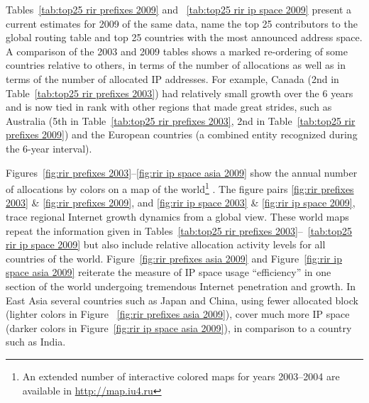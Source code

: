 Tables~\ref{tab:top25 rir prefixes 2009} and ~\ref{tab:top25 rir ip space
2009} present a current estimates for 2009 of the same data, name the 
top 25 contributors to the global routing table and top 25 countries with 
the most announced address space. A comparison of the 2003 and 2009 tables 
shows a marked re-ordering of some countries relative to others, in terms 
of the number of allocations as well as in terms of the number of allocated 
IP addresses. For example, Canada (2nd in 
Table~\ref{tab:top25 rir prefixes 2003}) had relatively small growth over 
the 6 years and is now tied in rank with other regions that made great strides, 
such as Australia (5th in Table~\ref{tab:top25 rir prefixes 2003}, 
2nd in Table~\ref{tab:top25 rir prefixes 2009}) and the European countries 
(a combined entity recognized during the 6-year interval).

Figures~\ref{fig:rir prefixes 2003}--\ref{fig:rir ip space asia 2009} show the
annual number of allocations by colors on a map of the world\footnote{%
An extended number of interactive colored maps for years 2003--2004 are 
available in \url{http://map.iu4.ru}
}
%
. The figure pairs 
\ref{fig:rir prefixes 2003} \& \ref{fig:rir prefixes 2009}, and 
\ref{fig:rir ip space 2003} \& \ref{fig:rir ip space 2009}, trace regional Internet 
growth dynamics from a global view.  These world maps repeat the information given 
in Tables~\ref{tab:top25 rir prefixes 2003}--~\ref{tab:top25 rir ip space
2009} but also include relative allocation activity levels for all countries of 
the world.  Figure~\ref{fig:rir prefixes asia 2009} and 
Figure~\ref{fig:rir ip space asia 2009} reiterate the measure of IP space usage
``efficiency'' in one section of the world undergoing tremendous Internet penetration 
and growth.  In East Asia several countries such as Japan and China, using fewer allocated 
block (lighter colors in Figure ~\ref{fig:rir prefixes asia 2009}), 
cover much more IP space (darker colors in Figure~\ref{fig:rir ip space asia 2009}), 
in comparison to a country such as India.


